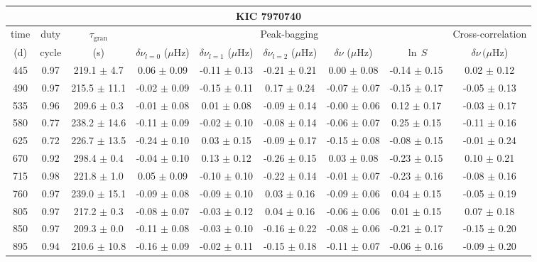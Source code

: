 \documentclass[twocolumn]{aastex61}%
\begin{document}
\begin{table*}[ht]\centering\fontsize{9.}{7.}\selectfont
\begin{tabular}{ccc|ccccc|c}
\multicolumn{9}{c}{KIC 7970740}\\ \hline\hline
time & duty & $\tau_\text{gran}$ &\multicolumn{5}{c|}{Peak-bagging}&Cross-correlation\\
(d)& cycle & (s)&$\delta\nu_{l=0}$ ($\mu$Hz) & $\delta\nu_{l=1}$ ($\mu$Hz) & $\delta\nu_{l=2}$ ($\mu$Hz) & $\delta\nu$ ($\mu$Hz)& $\ln\,S$ & $\delta\nu\,(\mu$Hz)\\\hline
445 & 0.97 & 219.1 $\pm$ 4.7 & 0.06 $\pm$ 0.09 & -0.11 $\pm$ 0.13 & -0.21 $\pm$ 0.21 & 0.00 $\pm$ 0.08 & -0.14 $\pm$ 0.15 & 0.02 $\pm$ 0.12\\
490 & 0.97 & 215.5 $\pm$ 11.1 & -0.02 $\pm$ 0.09 & -0.15 $\pm$ 0.11 & 0.17 $\pm$ 0.24 & -0.07 $\pm$ 0.07 & -0.15 $\pm$ 0.17 & -0.05 $\pm$ 0.13\\
535 & 0.96 & 209.6 $\pm$ 0.3 & -0.01 $\pm$ 0.08 & 0.01 $\pm$ 0.08 & -0.09 $\pm$ 0.14 & -0.00 $\pm$ 0.06 & 0.12 $\pm$ 0.17 & -0.03 $\pm$ 0.17\\
580 & 0.77 & 238.2 $\pm$ 14.6 & -0.11 $\pm$ 0.09 & -0.02 $\pm$ 0.10 & -0.08 $\pm$ 0.14 & -0.06 $\pm$ 0.07 & 0.25 $\pm$ 0.15 & -0.11 $\pm$ 0.16\\
625 & 0.72 & 226.7 $\pm$ 13.5 & -0.24 $\pm$ 0.10 & 0.03 $\pm$ 0.15 & -0.09 $\pm$ 0.17 & -0.15 $\pm$ 0.08 & -0.08 $\pm$ 0.15 & -0.01 $\pm$ 0.24\\
670 & 0.92 & 298.4 $\pm$ 0.4 & -0.04 $\pm$ 0.10 & 0.13 $\pm$ 0.12 & -0.26 $\pm$ 0.15 & 0.03 $\pm$ 0.08 & -0.23 $\pm$ 0.15 & 0.10 $\pm$ 0.21\\
715 & 0.98 & 221.8 $\pm$ 1.0 & 0.05 $\pm$ 0.09 & -0.10 $\pm$ 0.10 & -0.22 $\pm$ 0.14 & -0.01 $\pm$ 0.07 & -0.23 $\pm$ 0.16 & -0.08 $\pm$ 0.16\\
760 & 0.97 & 239.0 $\pm$ 15.1 & -0.09 $\pm$ 0.08 & -0.09 $\pm$ 0.10 & 0.03 $\pm$ 0.16 & -0.09 $\pm$ 0.06 & 0.04 $\pm$ 0.15 & -0.05 $\pm$ 0.19\\
805 & 0.97 & 217.2 $\pm$ 0.3 & -0.08 $\pm$ 0.07 & -0.03 $\pm$ 0.12 & 0.04 $\pm$ 0.16 & -0.06 $\pm$ 0.06 & 0.01 $\pm$ 0.15 & 0.07 $\pm$ 0.18\\
850 & 0.97 & 209.3 $\pm$ 0.0 & -0.11 $\pm$ 0.08 & -0.03 $\pm$ 0.10 & -0.16 $\pm$ 0.22 & -0.08 $\pm$ 0.06 & -0.21 $\pm$ 0.17 & -0.15 $\pm$ 0.20\\
895 & 0.94 & 210.6 $\pm$ 10.8 & -0.16 $\pm$ 0.09 & -0.02 $\pm$ 0.11 & -0.15 $\pm$ 0.18 & -0.11 $\pm$ 0.07 & -0.06 $\pm$ 0.16 & -0.09 $\pm$ 0.20\\

\end{tabular}
\end{table*}
\end{document}
